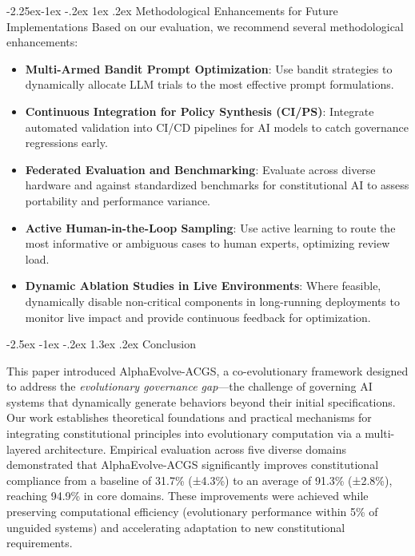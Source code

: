 \documentclass[manuscript,screen,review,anonymous,9pt]{acmart}
\makeatletter
\renewcommand\section{\@startsection{section}{1}{\z@}%
  {-2.5ex \@plus -1ex \@minus -.2ex}%
  {1.3ex \@plus.2ex}%
  {\normalfont\Large\bfseries}}
\renewcommand\subsection{\@startsection{subsection}{2}{\z@}%
  {-2.25ex\@plus -1ex \@minus -.2ex}%
  {1ex \@plus .2ex}%
  {\normalfont\large\bfseries}}
\makeatother
\begin{document}
\subsection{Methodological Enhancements for Future Implementations}
\label{subsec:methodology_optimization} 
Based on our evaluation, we recommend several methodological enhancements:
\begin{itemize}[leftmargin=*,itemsep=1pt,parsep=1pt]
    \item \textbf{Multi-Armed Bandit Prompt Optimization}: Use bandit strategies to dynamically allocate LLM trials to the most effective prompt formulations.
    \item \textbf{Continuous Integration for Policy Synthesis (CI/PS)}: Integrate automated validation into CI/CD pipelines for AI models to catch governance regressions early.
    \item \textbf{Federated Evaluation and Benchmarking}: Evaluate across diverse hardware and against standardized benchmarks for constitutional AI to assess portability and performance variance.
    \item \textbf{Active Human-in-the-Loop Sampling}: Use active learning to route the most informative or ambiguous cases to human experts, optimizing review load.
    \item \textbf{Dynamic Ablation Studies in Live Environments}: Where feasible, dynamically disable non-critical components in long-running deployments to monitor live impact and provide continuous feedback for optimization.
\end{itemize}


\section{Conclusion}
\label{sec:conclusion}

This paper introduced AlphaEvolve-ACGS, a co-evolutionary framework designed to address the \textit{evolutionary governance gap}—the challenge of governing AI systems that dynamically generate behaviors beyond their initial specifications. Our work establishes theoretical foundations and practical mechanisms for integrating constitutional principles into evolutionary computation via a multi-layered architecture. Empirical evaluation across five diverse domains demonstrated that AlphaEvolve-ACGS significantly improves constitutional compliance from a baseline of 31.7\% (±4.3\%) to an average of 91.3\% (±2.8\%), reaching 94.9\% in core domains. These improvements were achieved while preserving computational efficiency (evolutionary performance within 5\% of unguided systems) and accelerating adaptation to new constitutional requirements.
\end{document}
